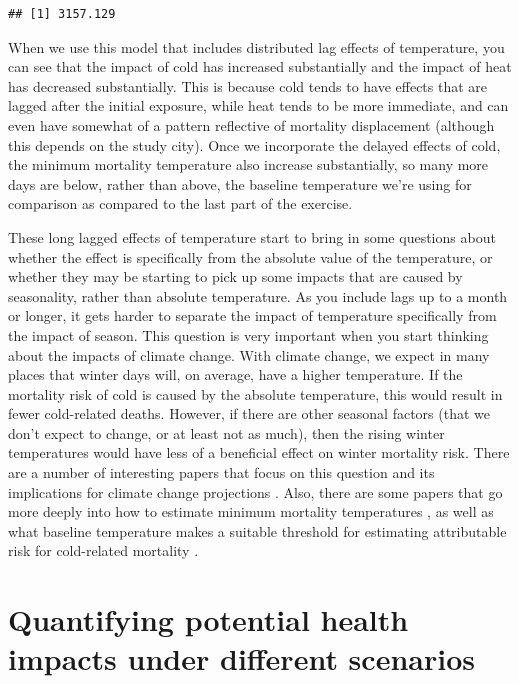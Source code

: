 \documentclass[
]{book}
\begin{document}
\begin{verbatim}
## [1] 3157.129
\end{verbatim}

When we use this model that includes distributed lag effects of temperature, you can see that the impact of cold has increased substantially and the impact of heat has decreased substantially. This is because cold tends to have effects that are lagged after the initial exposure, while heat tends to be more immediate, and can even have somewhat of a pattern reflective of mortality displacement (although this depends on the study city). Once we incorporate the delayed effects of cold, the minimum mortality temperature also increase substantially, so many more days are below, rather than above, the baseline temperature we're using for comparison as compared to the last part of the exercise.

These long lagged effects of temperature start to bring in some questions about whether the effect is specifically from the absolute value of the temperature, or whether they may be starting to pick up some impacts that are caused by seasonality, rather than absolute temperature. As you include lags up to a month or longer, it gets harder to separate the impact of temperature specifically from the impact of season. This question is very important when you start thinking about the impacts of climate change. With climate change, we expect in many places that winter days will, on average, have a higher temperature. If the mortality risk of cold is caused by the absolute temperature, this would result in fewer cold-related deaths. However, if there are other seasonal factors (that we don't expect to change, or at least not as much), then the rising winter temperatures would have less of a beneficial effect on winter mortality risk. There are a number of interesting papers that focus on this question and its implications for climate change projections \citep{kinney2015winter, ebi2015greater, hajat2016excess}. Also, there are some papers that go more deeply into how to estimate minimum mortality temperatures \citep{lee2017monte, tobias2017investigating}, as well as what baseline temperature makes a suitable threshold for estimating attributable risk for cold-related mortality \citep{arbuthnott2018cold}.

\hypertarget{quantifying-potential-health-impacts-under-different-scenarios}{%
\section{Quantifying potential health impacts under different scenarios}\label{quantifying-potential-health-impacts-under-different-scenarios}}
\end{document}
